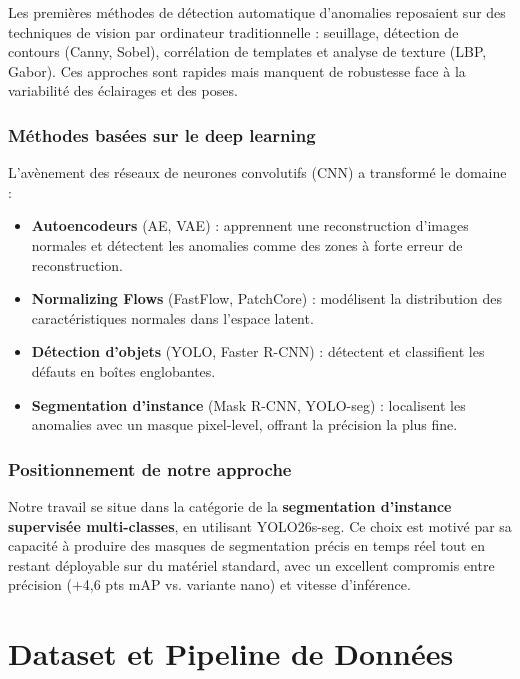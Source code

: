 \documentclass[12pt, a4paper]{report}
\begin{document}
Les premières méthodes de détection automatique d'anomalies reposaient sur des techniques de vision par ordinateur traditionnelle : seuillage, détection de contours (Canny, Sobel), corrélation de templates et analyse de texture (LBP, Gabor). Ces approches sont rapides mais manquent de robustesse face à la variabilité des éclairages et des poses.

\subsection{Méthodes basées sur le deep learning}

L'avènement des réseaux de neurones convolutifs (CNN) a transformé le domaine :

\begin{itemize}
  \item \textbf{Autoencodeurs} (AE, VAE) : apprennent une reconstruction d'images normales et détectent les anomalies comme des zones à forte erreur de reconstruction.
  \item \textbf{Normalizing Flows} (FastFlow, PatchCore) : modélisent la distribution des caractéristiques normales dans l'espace latent.
  \item \textbf{Détection d'objets} (YOLO, Faster R-CNN) : détectent et classifient les défauts en boîtes englobantes.
  \item \textbf{Segmentation d'instance} (Mask R-CNN, YOLO-seg) : localisent les anomalies avec un masque pixel-level, offrant la précision la plus fine.
\end{itemize}

\subsection{Positionnement de notre approche}

Notre travail se situe dans la catégorie de la \textbf{segmentation d'instance supervisée multi-classes}, en utilisant YOLO26s-seg. Ce choix est motivé par sa capacité à produire des masques de segmentation précis en temps réel tout en restant déployable sur du matériel standard, avec un excellent compromis entre précision (+4,6 pts mAP vs. variante nano) et vitesse d'inférence.

\newpage

\chapter{Dataset et Pipeline de Données}
\end{document}
